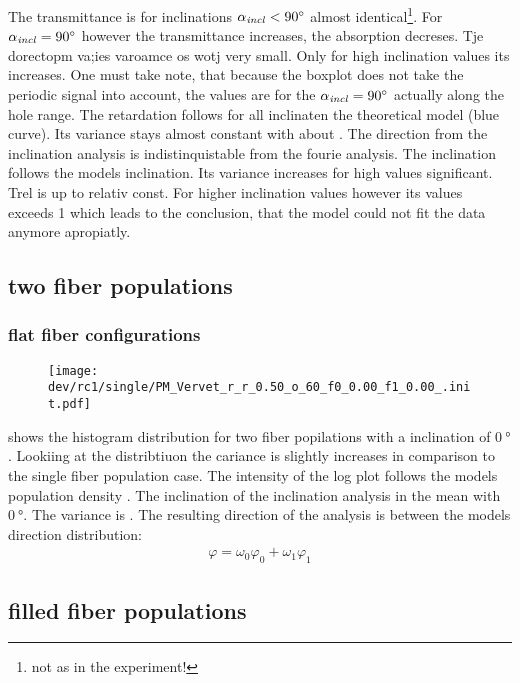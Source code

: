 The transmittance is for inclinations $\textnormal{$\alpha_{\mathit{incl}}$}<\SI{90}{\degree}$ almost identical\footnote{not as in the experiment!}.
For $\textnormal{$\alpha_{\mathit{incl}}$}= \SI{90}{\degree}$ however the transmittance increases, \ie{} the absorption decreses.
Tje dorectopm va;ies varoamce os wotj \dummy{} very small.
Only for high inclination values its increases.
One must take note, that because the boxplot does not take the periodic signal into account, the values are for the $\textnormal{$\alpha_{\mathit{incl}}$}= \SI{90}{\degree}$ actually along the hole range.
The retardation follows for all inclinaten the theoretical model (blue curve).
Its variance stays almost constant with about \dummy{}.
The direction from the inclination analysis is indistinquistable from the fourie analysis.
The inclination follows the models inclination.
Its variance increases for high values significant.
Trel is up to \dummy{} relativ const.
For higher inclination values however its values exceeds 1 which leads to the conclusion, that the model could not fit the data anymore apropiatly.
% 
% 
% 
\subsection{two fiber populations}
% 
\subsubsection{flat fiber configurations}
% 
\begin{figure}[!tp]
\centering
\texttt{[image: dev/rc1/single/PM\_Vervet\_r\_r\_0.50\_o\_60\_f0\_0.00\_f1\_0.00\_.init.pdf]} 
\caption[hist]{}
\label{fig:flat_crossing_hist}
\end{figure}
% 
 shows the histogram distribution for two fiber popilations with a inclination of $\SI{0}{\degree}$.
Lookiing at the distribtiuon the cariance is slightly increases in comparison to the single fiber population case.
The intensity of the log plot follows the models population density \modelPsi{} .
The inclination of the inclination analysis in the mean with $\SI{0}{\degree}$.
The variance is \dummy{}.
The resulting direction of the analysis is between the models direction distribution:
\begin{align}
    \varphi = \omega_0 \varphi_0 + \omega_1 \varphi_1
\end{align}
% 
% 
% 
\subsection{filled fiber populations}

